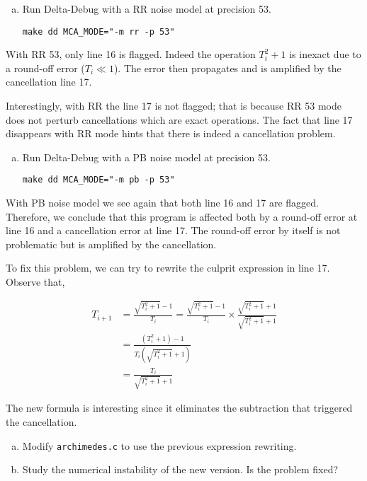\begin{question}
  \begin{enumerate}[(a)]
    \item Run Delta-Debug with a RR noise model at precision 53.
      \begin{verbatim}
make dd MCA_MODE="-m rr -p 53"
      \end{verbatim}
  \end{enumerate}
\end{question}

With RR 53, only line 16 is flagged. Indeed the operation $T_i^2+1$ is inexact
due to a round-off error ($T_i \ll 1$). The error then propagates and is amplified
by the cancellation line 17.

Interestingly, with RR the line 17 is not flagged; that is because RR 53 mode
does not perturb cancellations which are exact operations. The fact that line
17 disappears with RR mode hints that there is indeed a cancellation problem.

\begin{question}
  \begin{enumerate}[(a)]
    \item Run Delta-Debug with a PB noise model at precision 53.
      \begin{verbatim}
make dd MCA_MODE="-m pb -p 53"
      \end{verbatim}
  \end{enumerate}
\end{question}

With PB noise model we see again that both line 16 and 17 are flagged.
Therefore, we conclude that this program is affected both by a round-off error
at line 16 and a cancellation error at line 17. The round-off error by itself
is not problematic but is amplified by the cancellation.

To fix this problem, we can try to rewrite the culprit expression in line 17.
Observe that,

\begin{align*}
  T_{i+1} &= \frac{\sqrt{T_i^2+1} - 1}{T_i} = \frac{\sqrt{T_i^2+1} - 1}{T_i} \times \frac{\sqrt{T_i^2+1} + 1}{\sqrt{T_i^2+1} + 1} \\
          &= \frac{(T_i^2 + 1) - 1}{T_i(\sqrt{T_i^2+1} + 1)} \\
          &= \frac{T_i}{\sqrt{T_i^2+1} + 1}
\end{align*}

The new formula is interesting since it eliminates the subtraction that triggered the cancellation.

\begin{question}
  \begin{enumerate}[(a)]
    \item Modify \texttt{archimedes.c} to use the previous expression rewriting.
    \item Study the numerical instability of the new version. Is the problem fixed?
  \end{enumerate}
\end{question}
